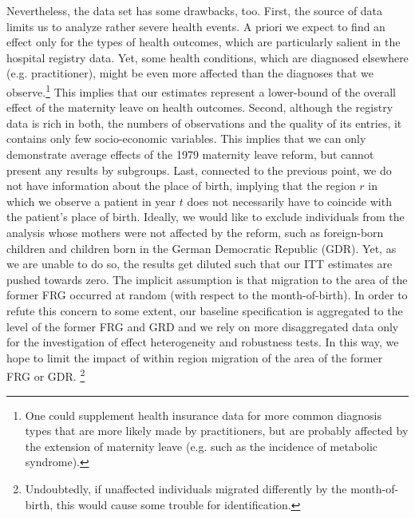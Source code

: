 \documentclass[11pt, a4paper]{article} %
\begin{document}
Nevertheless, the data set has some drawbacks, too. First, the source of data limits us to analyze rather severe health events. A priori we expect to find an effect only for the types of health outcomes, which are particularly salient in the hospital registry data. Yet, some health conditions, which are diagnosed elsewhere (e.g. practitioner), might be even more affected than the diagnoses that we observe.\footnote{One could supplement health insurance data for more common diagnosis types that are more likely made by practitioners, but are probably affected by the extension of maternity leave (e.g. such as the incidence of metabolic syndrome).} This implies that our estimates represent a lower-bound of the overall effect of the maternity leave on health outcomes. \newline%
 Second, although the registry data is rich in both, the numbers of observations and the quality of its entries, it contains only few socio-economic variables. This implies that we can only demonstrate average effects of the 1979 maternity leave reform, but cannot present any results by subgroups. Last, connected to the previous point, we do not have information about the place of birth, implying that the region $r$ in which we observe a patient in year $t$ does not necessarily have to coincide with the patient's place of birth. Ideally, we would like to exclude individuals from the analysis whose mothers were not affected by the reform, such as foreign-born children and children born in the German Democratic Republic (GDR). Yet, as we are unable to do so, the results get diluted such that our ITT estimates are pushed towards zero. The implicit assumption is that migration to the area of the former FRG occurred at random (with respect to the month-of-birth). In order to refute this concern to some extent, our baseline specification is aggregated to the level of the former FRG and GRD and we rely on more disaggregated data only for the investigation of effect heterogeneity and robustness tests. In this way, we hope to limit the impact of within region migration of the area of the former FRG or GDR. \footnote{Undoubtedly, if unaffected individuals migrated differently by the month-of-birth, this would cause some trouble for identification.}\newline
\end{document}

